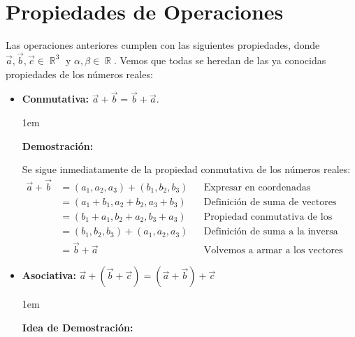 \documentclass[12pt, fleqn]{report}                             %
\newenvironment{SmallIndentation}[1][0.75em]                    %
        {\begin{adjustwidth}{#1}{}\begin{footnotesize}}             %
        {\end{footnotesize}\end{adjustwidth}}                       %
\theoremstyle{break}                                            %
\DeclareMathOperator \Reals        {\mathbb{R}}                 %
\newcommand{\Wrap}[1]           {\left( #1 \right)}             %
\begin{document}
        \section{Propiedades de Operaciones}
        
            Las operaciones anteriores cumplen con las siguientes propiedades, donde
            $\vec{a},\vec{b}, \vec{c} \in \Reals^3$ y $\alpha, \beta \in \Reals$.
            Vemos que todas se heredan de las ya conocidas propiedades de los números reales:

            \begin{itemize}
                
                \item \textbf{Conmutativa:} 
                    $\vec{a}+\vec{b} = \vec{b}+\vec{a}$.
                
                    \begin{SmallIndentation}[1em]
                        \textbf{Demostración:}

                        Se sigue inmediatamente de la propiedad conmutativa de los números reales:
                        \begin{align*}
                            \vec{a} + \vec{b} 
                                &= (a_1, a_2, a_3) + (b_1, b_2, b_3)  &&\mbox{Expresar en coordenadas}              \\
                                &= (a_1 + b_1, a_2 + b_2, a_3 + b_3)  &&\mbox{Definición de suma de vectores}       \\
                                &= (b_1 + a_1, b_2 + a_2, b_3 + a_3)  &&\mbox{Propiedad conmutativa de los reales}  \\
                                &= (b_1, b_2, b_3) + (a_1, a_2, a_3)  &&\mbox{Definición de suma a la inversa}      \\
                                &= \vec{b} + \vec{a}                  &&\mbox{Volvemos a armar a los vectores}
                        \end{align*}

                    \end{SmallIndentation}
                
                \item \textbf{Asociativa:} 
                    $\vec{a} + \Wrap{\vec{b}+\vec{c}} = \Wrap{\vec{a} + \vec{b} } + \vec{c}$
                    
                    \begin{SmallIndentation}[1em]
                        \textbf{Idea de Demostración:}
                    

\end{SmallIndentation}
\end{itemize}
\end{document}
